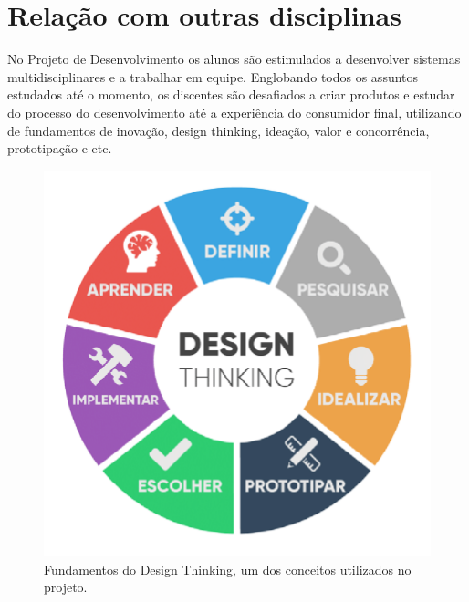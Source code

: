 \documentclass{article}
\begin{document}
\section{Relação com outras disciplinas}
    No Projeto de Desenvolvimento os alunos são estimulados a desenvolver sistemas multidisciplinares e a trabalhar em equipe. Englobando todos os assuntos estudados até o momento, os discentes são desafiados a criar produtos e estudar do processo do desenvolvimento até a experiência do consumidor final, utilizando de fundamentos de inovação, design thinking, ideação, valor e concorrência, prototipação e etc. \cite{Site3}

\begin{figure}[h!]
\centering
\includegraphics[scale=0.3]{designthinking}
\caption{Fundamentos do Design Thinking, um dos conceitos utilizados no projeto. \cite{imagem3}}
\label{fig:designthinking}
\end{figure}




\end{document}
